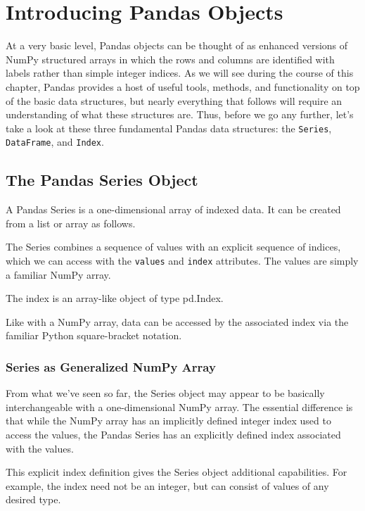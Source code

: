 \chapter{Introducing Pandas Objects\label{Ch13}}

At a very basic level, Pandas objects can be thought of as enhanced versions of
NumPy structured arrays in which the rows and columns are identified with labels
rather than simple integer indices. As we will see during the course of this chapter,
Pandas provides a host of useful tools, methods, and functionality on top of the basic
data structures, but nearly everything that follows will require an understanding of
what these structures are. Thus, before we go any further, let's take a look at these
three fundamental Pandas data structures: the \verb|Series|, \verb|DataFrame|, and \verb|Index|.

\section{The Pandas Series Object}
A Pandas Series is a one-dimensional array of indexed data. It can be created from a
list or array as follows.

The Series combines a sequence of values with an explicit sequence of indices,
which we can access with the \verb|values| and \verb|index| attributes. The values are simply a
familiar NumPy array.

The index is an array-like object of type pd.Index.

Like with a NumPy array, data can be accessed by the associated index via the familiar
Python square-bracket notation.
\subsection*{Series as Generalized NumPy Array}
From what we've seen so far, the Series object may appear to be basically interchangeable with a one-dimensional NumPy array. The essential difference is that
while the NumPy array has an implicitly defined integer index used to access the values, the Pandas Series has an explicitly defined index associated with the values.

This explicit index definition gives the Series object additional capabilities. For
example, the index need not be an integer, but can consist of values of any desired
type.

